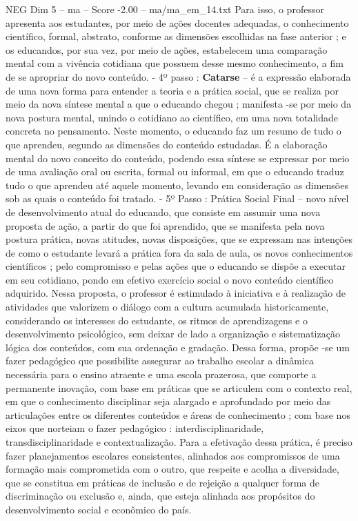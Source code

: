 \begin{textsample}{NEG Dim 5 – ma – Score -2.00 – ma/ma\_em\_14.txt}
Para isso, o professor apresenta aos estudantes, por meio de ações docentes adequadas, o conhecimento científico, formal, abstrato, conforme as dimensões escolhidas na fase anterior ; e os educandos, por sua vez, por meio de ações, estabelecem uma comparação mental com a vivência cotidiana que possuem desse mesmo conhecimento, a fim de se apropriar do novo conteúdo. - 4º passo : \textbf{Catarse} – é a expressão elaborada de uma nova forma para entender a teoria e a prática social, que se realiza por meio da nova síntese mental a que o educando chegou ; manifesta -se por meio da nova postura mental, unindo o cotidiano ao científico, em uma nova totalidade concreta no pensamento.
Neste momento, o educando faz um resumo de tudo o que aprendeu, segundo as dimensões do conteúdo estudadas.
É a elaboração mental do novo conceito do conteúdo, podendo essa síntese se expressar por meio de uma avaliação oral ou escrita, formal ou informal, em que o educando traduz tudo o que aprendeu até aquele momento, levando em consideração as dimensões sob as quais o conteúdo foi tratado. - 5º Passo : Prática Social Final – novo nível de desenvolvimento atual do educando, que consiste em assumir uma nova proposta de ação, a partir do que foi aprendido, que se manifesta pela nova postura prática, novas atitudes, novas disposições, que se expressam nas intenções de como o estudante levará a prática fora da sala de aula, os novos conhecimentos científicos ; pelo compromisso e pelas ações que o educando se dispõe a executar em seu cotidiano, pondo em efetivo exercício social o novo conteúdo científico adquirido.
Nessa proposta, o professor é estimulado à iniciativa e à realização de atividades que valorizem o diálogo com a cultura acumulada historicamente, considerando os interesses do estudante, os ritmos de aprendizagens e o desenvolvimento psicológico, sem deixar de lado a organização e sistematização lógica dos conteúdos, com sua ordenação e gradação.
Dessa forma, propõe -se um fazer pedagógico que possibilite assegurar ao trabalho escolar a dinâmica necessária para o ensino atraente e uma escola prazerosa, que comporte a permanente inovação, com base em práticas que se articulem com o contexto real, em que o conhecimento disciplinar seja alargado e aprofundado por meio das articulações entre os diferentes conteúdos e áreas de conhecimento ; com base nos eixos que norteiam o fazer pedagógico : interdisciplinaridade, transdisciplinaridade e contextualização.
Para a efetivação dessa prática, é preciso fazer planejamentos escolares consistentes, alinhados aos compromissos de uma formação mais comprometida com o outro, que respeite e acolha a diversidade, que se constitua em práticas de inclusão e de rejeição a qualquer forma de discriminação ou exclusão e, ainda, que esteja alinhada aos propósitos do desenvolvimento social e econômico do país.

\end{textsample}

